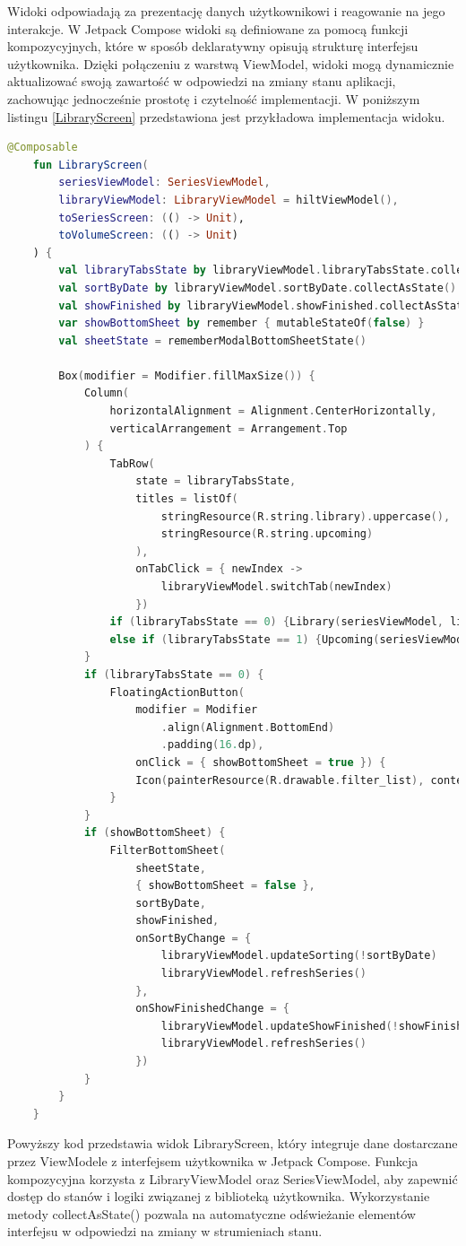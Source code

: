 \documentclass[12pt,twoside]{article}
\begin{document}
Widoki odpowiadają za prezentację danych użytkownikowi i reagowanie na jego interakcje. W Jetpack Compose widoki 
są definiowane za pomocą funkcji kompozycyjnych, które w sposób deklaratywny opisują strukturę interfejsu 
użytkownika. Dzięki połączeniu z warstwą ViewModel, widoki mogą dynamicznie aktualizować swoją zawartość w 
odpowiedzi na zmiany stanu aplikacji, zachowując jednocześnie prostotę i czytelność implementacji. W poniższym
listingu \ref{LibraryScreen} przedstawiona jest przykładowa implementacja widoku.
\begin{lstlisting}[language=Kotlin,caption=Kod widoku LibraryScreen , label={LibraryScreen}]
	@Composable
	fun LibraryScreen(
		seriesViewModel: SeriesViewModel,
		libraryViewModel: LibraryViewModel = hiltViewModel(),
		toSeriesScreen: (() -> Unit),
		toVolumeScreen: (() -> Unit)
	) {
		val libraryTabsState by libraryViewModel.libraryTabsState.collectAsState()
		val sortByDate by libraryViewModel.sortByDate.collectAsState()
		val showFinished by libraryViewModel.showFinished.collectAsState()
		var showBottomSheet by remember { mutableStateOf(false) }
		val sheetState = rememberModalBottomSheetState()
	
		Box(modifier = Modifier.fillMaxSize()) {
			Column(
				horizontalAlignment = Alignment.CenterHorizontally,
				verticalArrangement = Arrangement.Top
			) {
				TabRow(
					state = libraryTabsState,
					titles = listOf(
						stringResource(R.string.library).uppercase(),
						stringResource(R.string.upcoming)
					),
					onTabClick = { newIndex ->
						libraryViewModel.switchTab(newIndex)
					})
				if (libraryTabsState == 0) {Library(seriesViewModel, libraryViewModel, toSeriesScreen)} 
				else if (libraryTabsState == 1) {Upcoming(seriesViewModel, libraryViewModel, toSeriesScreen, toVolumeScreen)}
			}
			if (libraryTabsState == 0) {
				FloatingActionButton(
					modifier = Modifier
						.align(Alignment.BottomEnd)
						.padding(16.dp),
					onClick = { showBottomSheet = true }) {
					Icon(painterResource(R.drawable.filter_list), contentDescription = null)
				}
			}
			if (showBottomSheet) {
				FilterBottomSheet(
					sheetState,
					{ showBottomSheet = false },
					sortByDate,
					showFinished,
					onSortByChange = {
						libraryViewModel.updateSorting(!sortByDate)
						libraryViewModel.refreshSeries()
					},
					onShowFinishedChange = {
						libraryViewModel.updateShowFinished(!showFinished)
						libraryViewModel.refreshSeries()
					})
			}
		}
	}
\end{lstlisting}
Powyższy kod przedstawia widok LibraryScreen, który integruje dane dostarczane przez ViewModele z interfejsem 
użytkownika w Jetpack Compose. Funkcja kompozycyjna korzysta z LibraryViewModel oraz SeriesViewModel, aby 
zapewnić dostęp do stanów i logiki związanej z biblioteką użytkownika. Wykorzystanie metody collectAsState() 
pozwala na automatyczne odświeżanie elementów interfejsu w odpowiedzi na zmiany w strumieniach stanu.
\end{document}
